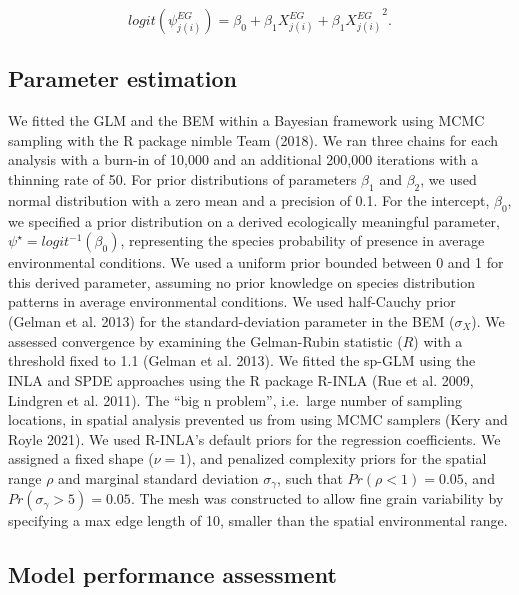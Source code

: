 \documentclass[
  12pt,
  a4paper]{article}
\begin{document}
\[ logit(\psi^{EG}_{j(i)}) = \beta_0 + \beta_1 X^{EG}_{j(i)} + \beta_1 {X^{EG}_{j(i)}}^2.\]

\hypertarget{parameter-estimation}{%
\subsection{Parameter estimation}\label{parameter-estimation}}

We fitted the GLM and the BEM within a Bayesian framework using MCMC sampling with the R package nimble Team (2018). We ran three chains for each analysis with a burn-in of 10,000 and an additional 200,000 iterations with a thinning rate of 50. For prior distributions of parameters \(\beta_1\) and \(\beta_2\), we used normal distribution with a zero mean and a precision of 0.1. For the intercept, \(\beta_0\), we specified a prior distribution on a derived ecologically meaningful parameter, \(\psi^{\star} = logit^{-1}(\beta_0)\), representing the species probability of presence in average environmental conditions. We used a uniform prior bounded between 0 and 1 for this derived parameter, assuming no prior knowledge on species distribution patterns in average environmental conditions. We used half-Cauchy prior (Gelman et al. 2013) for the standard-deviation parameter in the BEM (\(\sigma_X\)). We assessed convergence by examining the Gelman-Rubin statistic (\(\hat{R}\)) with a threshold fixed to 1.1 (Gelman et al. 2013).
We fitted the sp-GLM using the INLA and SPDE approaches using the R package R-INLA (Rue et al. 2009, Lindgren et al. 2011). The ``big n problem'', i.e.~large number of sampling locations, in spatial analysis prevented us from using MCMC samplers (Kery and Royle 2021). We used R-INLA's default priors for the regression coefficients. We assigned a fixed shape (\(\nu = 1\)), and penalized complexity priors for the spatial range \(\rho\) and marginal standard deviation \(\sigma_{\gamma}\), such that \(Pr(\rho < 1) = 0.05\), and \(Pr(\sigma_{\gamma} > 5) = 0.05\). The mesh was constructed to allow fine grain variability by specifying a max edge length of 10, smaller than the spatial environmental range.

\hypertarget{model-performance-assessment}{%
\subsection{Model performance assessment}\label{model-performance-assessment}}
\end{document}
